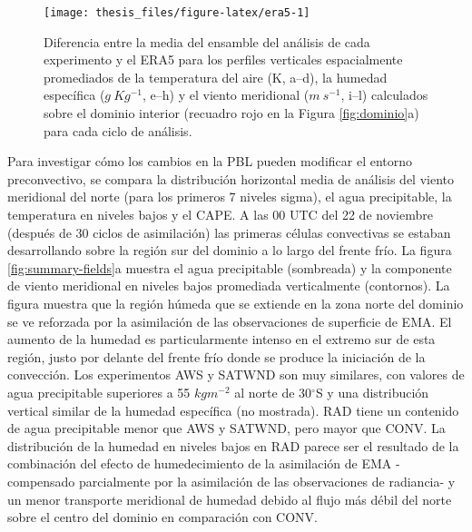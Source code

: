 \documentclass[12pt,oneside]{reedthesis}
\begin{document}
\begin{figure}

{\centering \texttt{[image: thesis\_files/figure-latex/era5-1]} 

}

\caption{Diferencia entre la media del ensamble del análisis de cada experimento y el ERA5 para los perfiles verticales espacialmente promediados de la temperatura del aire (K, a--d), la humedad específica (\(g\ Kg^{-1}\), e--h) y el viento meridional (\(m\ s^{-1}\), i--l) calculados sobre el dominio interior (recuadro rojo en la Figura \ref{fig:dominio}a) para cada ciclo de análisis.}\label{fig:era5}
\end{figure}
Para investigar cómo los cambios en la PBL pueden modificar el entorno preconvectivo, se compara la distribución horizontal media de análisis del viento meridional del norte (para los primeros 7 niveles sigma), el agua precipitable, la temperatura en niveles bajos y el CAPE. A las 00 UTC del 22 de noviembre (después de 30 ciclos de asimilación) las primeras células convectivas se estaban desarrollando sobre la región sur del dominio a lo largo del frente frío. La figura \ref{fig:summary-fields}a muestra el agua precipitable (sombreada) y la componente de viento meridional en niveles bajos promediada verticalmente (contornos). La figura muestra que la región húmeda que se extiende en la zona norte del dominio se ve reforzada por la asimilación de las observaciones de superficie de EMA. El aumento de la humedad es particularmente intenso en el extremo sur de esta región, justo por delante del frente frío donde se produce la iniciación de la convección. Los experimentos AWS y SATWND son muy similares, con valores de agua precipitable superiores a 55 \(kgm^{-2}\) al norte de 30\(^{\circ}\)S y una distribución vertical similar de la humedad específica (no mostrada). RAD tiene un contenido de agua precipitable menor que AWS y SATWND, pero mayor que CONV. La distribución de la humedad en niveles bajos en RAD parece ser el resultado de la combinación del efecto de humedecimiento de la asimilación de EMA -compensado parcialmente por la asimilación de las observaciones de radiancia- y un menor transporte meridional de humedad debido al flujo más débil del norte sobre el centro del dominio en comparación con CONV.
\end{document}
